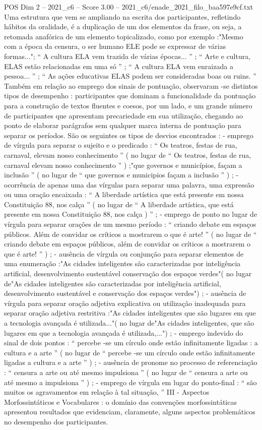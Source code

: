 \begin{textsample}{POS Dim 2 – 2021\_c6 – Score 3.00 – 2021\_c6/enade\_2021\_filo\_baa597e9cf.txt}
Uma estrutura que vem se ampliando na escrita dos participantes, refletindo hábitos da oralidade, é a duplicação de um dos elementos da frase, ou seja, a retomada anafórica de um elemento topicalizado, como por exemplo :"Mesmo com a época da censura, o ser humano ELE pode se expressar de várias formas..."; “ A cultura ELA vem trazida de várias épocas... ” ; “ Arte e cultura, ELAS estão relacionadas em uma só ” ; “ A cultura ELA vem enraizada a pessoa... ” ; “ As ações educativas ELAS podem ser consideradas boas ou ruins. ” Também em relação ao emprego dos sinais de pontuação, observaram -se distintos tipos de desempenho : participantes que dominam a funcionalidade da pontuação para a construção de textos fluentes e coesos, por um lado, e um grande número de participantes que apresentam precariedade em sua utilização, chegando ao ponto de elaborar parágrafos sem qualquer marca interna de pontuação para separar os períodos.
São os seguintes os tipos de desvios encontrados : - emprego de vírgula para separar o sujeito e o predicado : “ Os teatros, festas de rua, carnaval, elevam nosso conhecimento ” ( no lugar de “ Os teatros, festas de rua, carnaval elevam nosso conhecimento ” ) ;"que governos e municípios, façam a inclusão ” ( no lugar de “ que governos e municipios façam a inclusão ” ) ; - ocorrência de apenas uma das vírgulas para separar uma palavra, uma expressão ou uma oração encaixada : “ A liberdade artística que está presente em nossa Constituição 88, nos calça ” ( no lugar de “ A liberdade artística, que está presente em nossa Constituição 88, nos calça ) ” ; - emprego de ponto no lugar de vírgula para separar orações de um mesmo período : “ criando debate em espaços públicos.
Além de convidar os críticos a mostrarem o que é arte! ” ( no lugar de “ criando debate em espaços públicos, além de convidar os críticos a mostrarem o que é arte! ” ) ; - ausência de vírgula ou conjunção para separar elementos de uma enumeração :"As cidades inteligentes são caracterizadas por inteligência artificial, desenvolvimento sustentável conservação dos espaços verdes"( no lugar de"As cidades inteligentes são caracterizadas por inteligência artificial, desenvolvimento sustentável e conservação dos espaços verdes") ; - ausência de vírgula para separar oração adjetiva explicativa ou utilização inadequada para separar oração adjetiva restritiva :"As cidades inteligentes que são lugares em que a tecnologia avançada é utilizada..."( no lugar de"As cidades inteligentes, que são lugares em que a tecnologia avançada é utilizada,...") ; - emprego indevido do sinal de dois pontos : “ percebe -se um círculo onde estão infinitamente ligadas : a cultura e a arte ” ( no lugar de “ percebe -se um círculo onde estão infinitamente ligadas a cultura e a arte ” ) ; - ausência de pronome no processo de referenciação : “ censura a arte ou até mesmo impulsiona ” ( no lugar de “ censura a arte ou até mesmo a impulsiona ” ) ; - emprego de vírgula em lugar do ponto-final : “ são muitos os agravamentos em relação à tal situação, ” III - Aspectos Morfossintáticos e Vocabulares : o domínio das convenções morfossintáticas apresentou resultados que evidenciam, claramente, alguns aspectos problemáticos no desempenho dos participantes.

\end{textsample}
